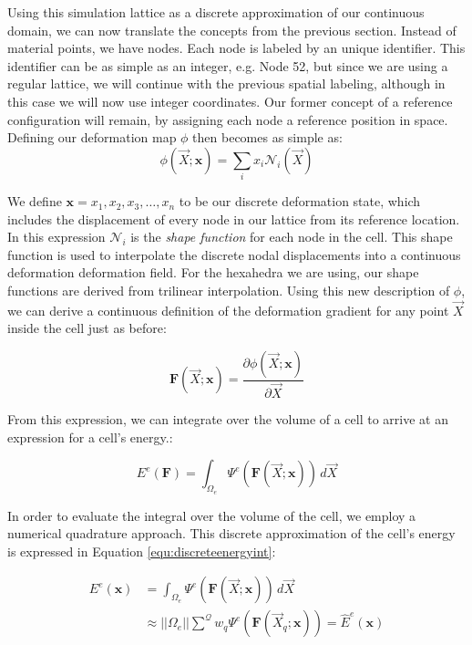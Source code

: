Using this simulation lattice as a discrete approximation of our
continuous domain, we can now translate the concepts from the previous
section. Instead of material points, we have nodes. Each node is
labeled by an unique identifier. This identifier can be as simple as an
integer, e.g. Node 52, but since we are using a regular lattice, we
will continue with the previous spatial labeling, although in this case we
will now use integer coordinates. Our former concept of a reference
configuration will remain, by assigning each node a reference position
in space. Defining our deformation map $\phi$ then becomes as
simple as:
\begin{equation}
  \label{equ:discretedeformationmap}
  \phi(\vec{X};\mathbf x) = \sum_i x_i \mathcal N_i(\vec{X})
\end{equation}

We define $\mathbf x = {x_1, x_2, x_3, \ldots, x_n}$ to be our
discrete deformation state, which includes the displacement of every node in
our lattice from its reference location. In this expression
$\mathcal N_i$ is the \textit{shape function} for each node in the
cell. This shape function is used to interpolate the discrete nodal
displacements into a continuous deformation deformation field. For the
hexahedra we are using, our shape functions are derived from
trilinear interpolation. Using this
new description of $\phi$, we can derive a continuous definition of the
deformation gradient for any point $\vec{X}$ inside the cell just as
before:

\begin{equation}
  \label{equ:discretedeformationgradient}
  \mathbf F(\vec{X};\mathbf x) = \frac{ \partial \phi(\vec{X};\mathbf x)
  }{\partial \vec{X}}
\end{equation}

From this expression, we can integrate over the volume of a cell to
arrive at an expression for a cell's energy.:

\begin{equation}
  \label{equ:discreteenergy}
   E^e(\mathbf F) = \int_{\Omega_{e}}\Psi^e( \mathbf F(\vec{X};\mathbf x) ) \,d \vec{X}
\end{equation}

In order to evaluate the integral over the volume of the cell, we
employ a numerical quadrature approach. This discrete approximation of the
cell's energy is expressed in Equation \ref{equ:discreteenergyint}:

\begin{equation}
  \label{equ:discreteenergyint}
  \begin{split}
  E^e(\bm x) &= \int_{\Omega_{e}}\Psi^e( \mathbf F(\vec{X};\mathbf x) ) \,d \vec{X}\\
  &\approx ||\Omega_e||\sum^{\mathcal Q}w_q\Psi^e(\bm F(\vec{X}_q;\bm
  x)) = \hat{E}^e(\bm x)
  \end{split}
\end{equation}



